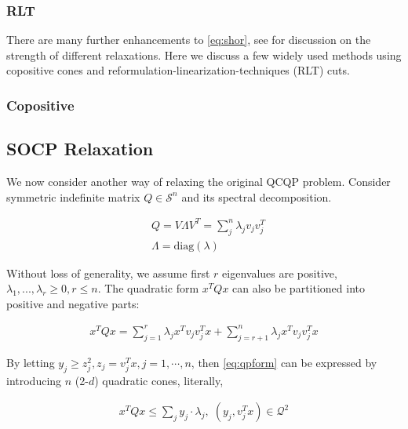 \documentclass[../main]{subfiles}
\begin{document}
\subsubsection{RLT}
There are many further enhancements to \eqref{eq:shor}, see \cite{bao_semidefinite_2011} for discussion on the strength of different relaxations. Here we discuss a few widely used methods using copositive cones and reformulation-linearization-techniques (RLT) cuts.
\subsubsection{Copositive}

\subsection{SOCP Relaxation}

We now consider another way of relaxing the original QCQP problem. Consider symmetric indefinite matrix \(Q \in \mathcal{S}^n\) and its spectral decomposition.

\begin{equation}
  \begin{aligned}
     & Q = V\Lambda V ^T =\sum_j^n \lambda_j v_j  v_j^T \\
     & \Lambda = \mathrm{diag}(\lambda)
  \end{aligned}
\end{equation}

Without loss of generality, we assume first \(r\) eigenvalues are positive, \(\lambda_1, ..., \lambda_r \ge 0, r\le n \). The quadratic form \(x^TQx\) can also be partitioned into positive and negative parts:

\begin{equation}\label{eq:qpform}
  \begin{aligned}
    x^TQx = \sum_{j=1}^r \lambda_j x^T v_j v_j^T x + \sum_{j=r+1}^n \lambda_j x^T v_j v_j^T x
  \end{aligned}
\end{equation}

By letting \(y_j \ge z_j^2, z_j = v_j^T x, j = 1, \cdots, n\), then \eqref{eq:qpform} can be expressed by introducing \(n\) (2-\(d\)) quadratic cones, literally,

\begin{equation}
  \begin{aligned}
    x^TQx \le \sum_j y_j \cdot \lambda_j,\; (y_j, v^T_j x) \in \mathcal{Q}^2
  \end{aligned}
\end{equation}
\end{document}
